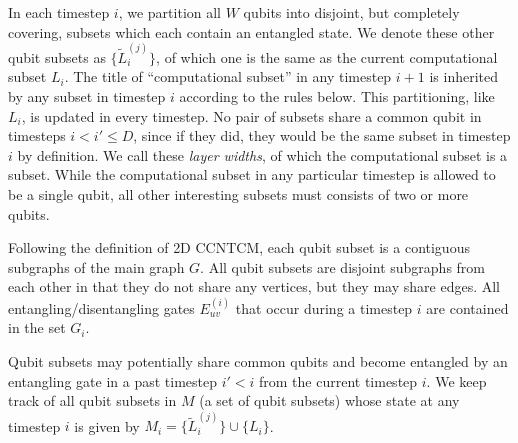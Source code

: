 In each timestep $i$, we partition all $W$ qubits into disjoint, but completely
covering, subsets which each contain an entangled state. We denote these other
qubit subsets as $\{\tilde{L}^{(j)}_i\}$, of which one is the same as the current
computational subset $L_i$. The title of ``computational subset'' in any timestep
$i+1$ is inherited by any subset in timestep $i$ according to the rules below.
This partitioning, like $L_i$, is updated in
every timestep. No pair of subsets share a common qubit in timesteps $i < i' \le D$,
since if they did, they would be the same subset in timestep $i$ by definition.
We call these \emph{layer widths}, of which the computational subset is
a subset. While the computational subset in any particular timestep is allowed to be a single qubit,
all other interesting subsets must consists of two or more qubits.

Following the definition of \textsf{2D CCNTCM}, each qubit subset is a
contiguous subgraphs of the main graph $G$. All qubit subsets are
disjoint subgraphs from each other in that they do not share any vertices,
but they may share edges. All entangling/disentangling gates $E^{(i)}_{uv}$
that occur during a timestep $i$ are contained in the set $G_i$.

Qubit subsets may potentially share common qubits and become entangled by an entangling gate
in a past timestep $i' < i$ from the current timestep $i$.
We keep track of all qubit subsets in $M$ (a set of qubit subsets) whose state at any
timestep $i$ is given by $M_i = \{\tilde{L}^{(j)}_i\} \cup \{ L_i \}$.

